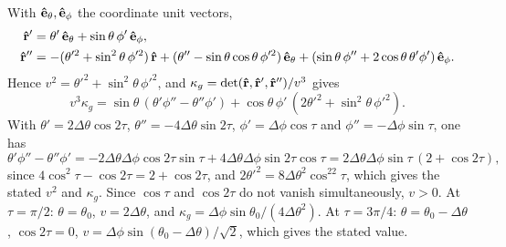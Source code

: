With \(\vu e_\theta, \vu e_\phi\) the coordinate unit vectors,
\begin{equation}
\begin{split}
    \vu r' &= \theta'\,\vu e_\theta + \sin\theta\,\phi'\,\vu e_\phi, \\
    \vu r'' &= -(\theta'^2 + \sin^2\theta\,\phi'^2)\,\vu r + (\theta'' - \sin\theta\cos\theta\,\phi'^2)\,\vu e_\theta + (\sin\theta\,\phi'' + 2\cos\theta\,\theta'\phi')\,\vu e_\phi.
\end{split}
\end{equation}
Hence \(v^2 = \theta'^2 + \sin^2\theta\,\phi'^2\), and \(\kappa_g = \det(\vu r, \vu r', \vu r'')/v^3\) gives
\begin{equation}
    v^3\kappa_g = \sin\theta\,(\theta'\phi'' - \theta''\phi') + \cos\theta\,\phi'\,(2\theta'^2 + \sin^2\theta\,\phi'^2).
\end{equation}
With \(\theta' = 2\Delta\theta\cos2\tau\), \(\theta'' = -4\Delta\theta\sin2\tau\), \(\phi' = \Delta\phi\cos\tau\) and \(\phi'' = -\Delta\phi\sin\tau\), one has
\begin{equation}
    \theta'\phi'' - \theta''\phi' = -2\Delta\theta\Delta\phi\cos2\tau\sin\tau + 4\Delta\theta\Delta\phi\sin2\tau\cos\tau = 2\Delta\theta\Delta\phi\sin\tau\,(2+\cos2\tau),
\end{equation}
since \(4\cos^2\tau - \cos2\tau = 2 + \cos2\tau\), and \(2\theta'^2 = 8\Delta\theta^2\cos^22\tau\), which gives the stated \(v^2\) and \(\kappa_g\).
Since \(\cos\tau\) and \(\cos2\tau\) do not vanish simultaneously, \(v>0\).
At \(\tau=\pi/2\): \(\theta=\theta_0\), \(v = 2\Delta\theta\), and \(\kappa_g = \Delta\phi\sin\theta_0/(4\Delta\theta^2)\).
At \(\tau = 3\pi/4\): \(\theta = \theta_0-\Delta\theta\), \(\cos2\tau=0\), \(v = \Delta\phi\sin(\theta_0-\Delta\theta)/\sqrt2\), which gives the stated value.

